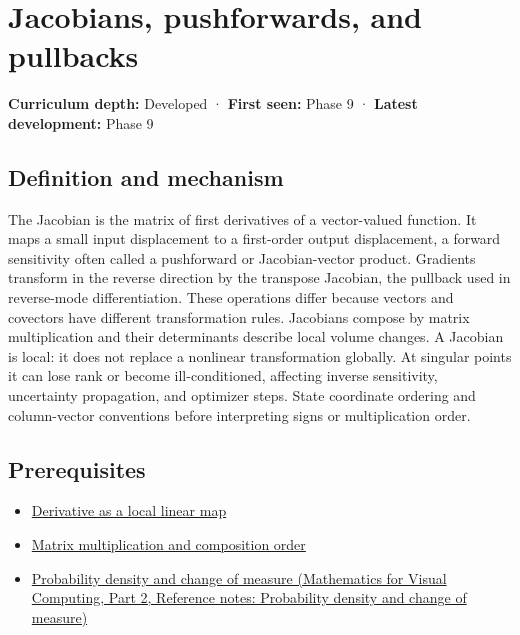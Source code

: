 \hypertarget{appendix-d8a7ddb675eb}{}\label{referencestart:appendix-d8a7ddb675eb}
\section{Jacobians, pushforwards, and pullbacks}\label{appendix-d8a7ddb675eb-jacobians-pushforwards-and-pullbacks}

\hypertarget{appendix-d8a7ddb675eb-jacobians-pushforwards-and-pullbacks}{}

\textbf{Curriculum depth:} Developed · \textbf{First seen:} Phase 9 · \textbf{Latest development:} Phase 9

\begin{allmightroledefinition}

\subsection{Definition and mechanism}\label{appendix-d8a7ddb675eb-definition-and-mechanism}

\hypertarget{appendix-d8a7ddb675eb-definition-and-mechanism}{}

The Jacobian is the matrix of first derivatives of a vector-valued function. It maps a small input displacement to a first-order output displacement, a forward sensitivity often called a pushforward or Jacobian-vector product. Gradients transform in the reverse direction by the transpose Jacobian, the pullback used in reverse-mode differentiation. These operations differ because vectors and covectors have different transformation rules. Jacobians compose by matrix multiplication and their determinants describe local volume changes. A Jacobian is local: it does not replace a nonlinear transformation globally. At singular points it can lose rank or become ill-conditioned, affecting inverse sensitivity, uncertainty propagation, and optimizer steps. State coordinate ordering and column-vector conventions before interpreting signs or multiplication order.

\end{allmightroledefinition}

\subsection{Prerequisites}\label{appendix-d8a7ddb675eb-prerequisites}

\hypertarget{appendix-d8a7ddb675eb-prerequisites}{}

\begin{itemize}
\tightlist
\item
  \hyperref[appendix-7bc181935c42]{Derivative as a local linear map}
\item
  \hyperref[appendix-ab31ef447dbf]{Matrix multiplication and composition order}
\item
  \href{../02-Mathematics-for-Visual-Computing-P02/main.pdf\#appendix-4815cd87ab8b}{Probability density and change of measure (Mathematics for Visual Computing, Part 2, Reference notes: Probability density and change of measure)}
\end{itemize}

